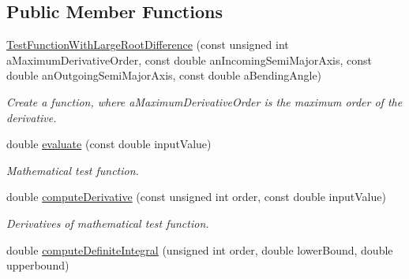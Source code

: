 \subsection*{Public Member Functions}
\begin{DoxyCompactItemize}
\item 
\hyperlink{structtudat_1_1unit__tests_1_1TestFunctionWithLargeRootDifference_aa7cce782c9f492cd6a9d689784197752}{Test\+Function\+With\+Large\+Root\+Difference} (const unsigned int a\+Maximum\+Derivative\+Order, const double an\+Incoming\+Semi\+Major\+Axis, const double an\+Outgoing\+Semi\+Major\+Axis, const double a\+Bending\+Angle)\hypertarget{structtudat_1_1unit__tests_1_1TestFunctionWithLargeRootDifference_aa7cce782c9f492cd6a9d689784197752}{}\label{structtudat_1_1unit__tests_1_1TestFunctionWithLargeRootDifference_aa7cce782c9f492cd6a9d689784197752}

\begin{DoxyCompactList}\small\item\em Create a function, where a\+Maximum\+Derivative\+Order is the maximum order of the derivative. \end{DoxyCompactList}\item 
double \hyperlink{structtudat_1_1unit__tests_1_1TestFunctionWithLargeRootDifference_a60e68f6399dbcd0204dba345f8fac4cd}{evaluate} (const double input\+Value)\hypertarget{structtudat_1_1unit__tests_1_1TestFunctionWithLargeRootDifference_a60e68f6399dbcd0204dba345f8fac4cd}{}\label{structtudat_1_1unit__tests_1_1TestFunctionWithLargeRootDifference_a60e68f6399dbcd0204dba345f8fac4cd}

\begin{DoxyCompactList}\small\item\em Mathematical test function. \end{DoxyCompactList}\item 
double \hyperlink{structtudat_1_1unit__tests_1_1TestFunctionWithLargeRootDifference_aad326dd34b4429048eb91d4d817892a2}{compute\+Derivative} (const unsigned int order, const double input\+Value)\hypertarget{structtudat_1_1unit__tests_1_1TestFunctionWithLargeRootDifference_aad326dd34b4429048eb91d4d817892a2}{}\label{structtudat_1_1unit__tests_1_1TestFunctionWithLargeRootDifference_aad326dd34b4429048eb91d4d817892a2}

\begin{DoxyCompactList}\small\item\em Derivatives of mathematical test function. \end{DoxyCompactList}\item 
double \hyperlink{structtudat_1_1unit__tests_1_1TestFunctionWithLargeRootDifference_ad6962299859f91ab61908e9097fbe6f7}{compute\+Definite\+Integral} (unsigned int order, double lower\+Bound, double upperbound)\hypertarget{structtudat_1_1unit__tests_1_1TestFunctionWithLargeRootDifference_ad6962299859f91ab61908e9097fbe6f7}{}\label{structtudat_1_1unit__tests_1_1TestFunctionWithLargeRootDifference_ad6962299859f91ab61908e9097fbe6f7}


\end{DoxyCompactItemize}
